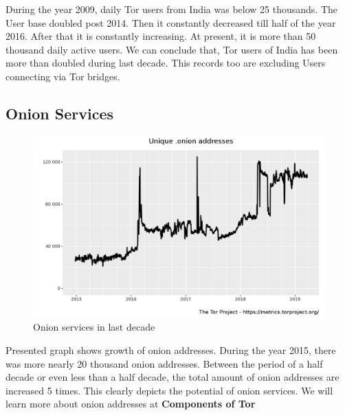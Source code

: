 \documentclass{article}
\begin{document}
      During the year 2009, daily Tor users from India was below 25 thousands.
      The User base doubled post 2014. Then it constantly decreased till half of
      the year 2016. After that it is constantly increasing. At present, it is
      more than 50 thousand daily active users. We can conclude that, Tor users
      of India has been more than doubled during last decade. This records too
      are excluding Users connecting via Tor bridges.

  \subsection{Onion Services}
    \begin{figure}[h!]
      \includegraphics[width=\linewidth]{onion-addresses-in-last-decade.png}
      \caption{Onion services in last decade}
      \label{fig:onion_service_in_last_decade}
    \end{figure}

    Presented graph shows growth of onion addresses. During the year 2015,
    there was more nearly 20 thousand onion addresses. Between the period of a
    half decade or even less than a half decade, the total amount of onion
    addresses are increased 5 times. This clearly depicts the potential of
    onion services. We will learn more about onion addresses at
    \textbf{Components of Tor}
\end{document}
